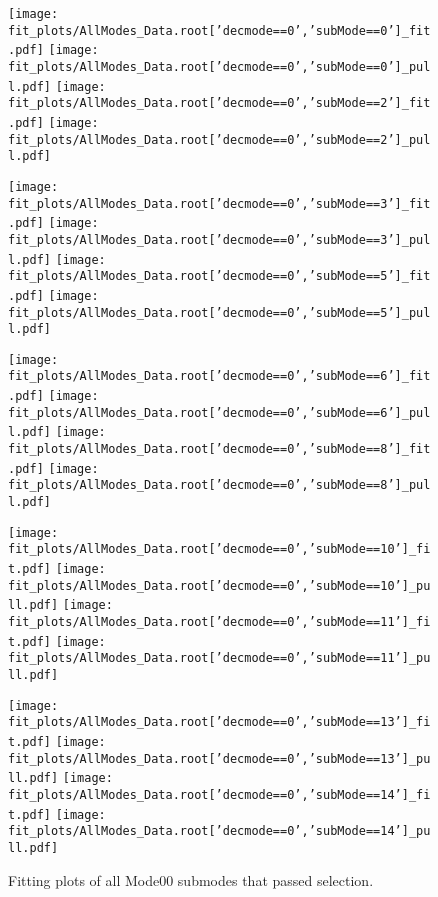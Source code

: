 \begin{figure}[h!]
\begin{center}
\texttt{[image: fit\_plots/AllModes\_Data.root['decmode==0','subMode==0']\_fit.pdf]}
\texttt{[image: fit\_plots/AllModes\_Data.root['decmode==0','subMode==0']\_pull.pdf]}
\texttt{[image: fit\_plots/AllModes\_Data.root['decmode==0','subMode==2']\_fit.pdf]}
\texttt{[image: fit\_plots/AllModes\_Data.root['decmode==0','subMode==2']\_pull.pdf]}

\texttt{[image: fit\_plots/AllModes\_Data.root['decmode==0','subMode==3']\_fit.pdf]}
\texttt{[image: fit\_plots/AllModes\_Data.root['decmode==0','subMode==3']\_pull.pdf]}
\texttt{[image: fit\_plots/AllModes\_Data.root['decmode==0','subMode==5']\_fit.pdf]}
\texttt{[image: fit\_plots/AllModes\_Data.root['decmode==0','subMode==5']\_pull.pdf]}

\texttt{[image: fit\_plots/AllModes\_Data.root['decmode==0','subMode==6']\_fit.pdf]}
\texttt{[image: fit\_plots/AllModes\_Data.root['decmode==0','subMode==6']\_pull.pdf]}
\texttt{[image: fit\_plots/AllModes\_Data.root['decmode==0','subMode==8']\_fit.pdf]}
\texttt{[image: fit\_plots/AllModes\_Data.root['decmode==0','subMode==8']\_pull.pdf]}

\texttt{[image: fit\_plots/AllModes\_Data.root['decmode==0','subMode==10']\_fit.pdf]}
\texttt{[image: fit\_plots/AllModes\_Data.root['decmode==0','subMode==10']\_pull.pdf]}
\texttt{[image: fit\_plots/AllModes\_Data.root['decmode==0','subMode==11']\_fit.pdf]}
\texttt{[image: fit\_plots/AllModes\_Data.root['decmode==0','subMode==11']\_pull.pdf]}

\texttt{[image: fit\_plots/AllModes\_Data.root['decmode==0','subMode==13']\_fit.pdf]}
\texttt{[image: fit\_plots/AllModes\_Data.root['decmode==0','subMode==13']\_pull.pdf]}
\texttt{[image: fit\_plots/AllModes\_Data.root['decmode==0','subMode==14']\_fit.pdf]}
\texttt{[image: fit\_plots/AllModes\_Data.root['decmode==0','subMode==14']\_pull.pdf]}
\caption{Fitting plots of all Mode00 submodes that passed selection.}
\label{fig:passMode00}
\end{center}
\end{figure}
